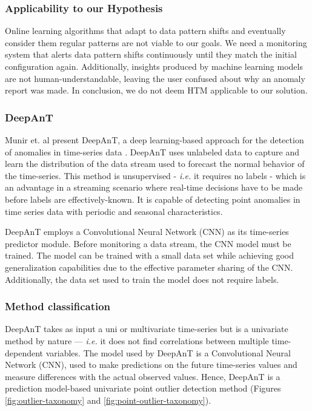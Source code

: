 \subsubsection*{Applicability to our Hypothesis}
Online learning algorithms that adapt to data pattern shifts and eventually consider them regular patterns are not viable to our goals. We need a monitoring system that alerts data pattern shifts continuously until they match the initial configuration again. Additionally, insights produced by machine learning models are not human-understandable, leaving the user confused about why an anomaly report was made. In conclusion, we do not deem HTM applicable to our solution.


\subsubsection{DeepAnT}
Munir et. al present DeepAnT, a deep learning-based approach for the detection of anomalies in time-series data \cite{Munir-DeepAnT}. DeepAnT uses unlabeled data to capture and learn the distribution of the data stream used to forecast the normal behavior of the time-series. This method is unsupervised - \textit{i.e.} it requires no labels - which is an advantage in a streaming scenario where real-time decisions have to be made before labels are effectively-known. It is capable of detecting point anomalies in time series data with periodic and seasonal characteristics.

DeepAnT employs a Convolutional Neural Network (CNN) as its time-series predictor module. Before monitoring a data stream, the CNN model must be trained. The model can be trained with a small data set while achieving good generalization capabilities due to the effective parameter sharing of the CNN. Additionally, the data set used to train the model does not require labels.

\subsubsection*{Method classification}
DeepAnT takes as input a uni or multivariate time-series but is a univariate method by nature --- \textit{i.e.} it does not find correlations between multiple time-dependent variables. The model used by DeepAnT is a Convolutional Neural Network (CNN), used to make predictions on the future time-series values and measure differences with the actual observed values. Hence, DeepAnT is a prediction model-based univariate point outlier detection method (Figures \ref{fig:outlier-taxonomy} and \ref{fig:point-outlier-taxonomy}).


